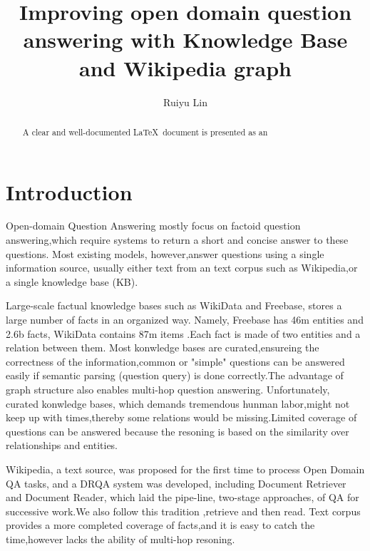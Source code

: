 \documentclass[sigconf]{acmart}
\begin{document}
	
	\title{Improving open domain question answering with Knowledge Base and Wikipedia graph}
	
	\author{Ruiyu Lin}
	
	
	\begin{abstract}
		A clear and well-documented \LaTeX\ document is presented as an
		
	\end{abstract}


	\maketitle
	
	\section{Introduction}
		Open-domain  Question Answering mostly focus on factoid question answering,which require systems to return a short and concise answer to these questions.
		Most existing models, however,answer questions using a single information
		source, usually either text from an text corpus such as Wikipedia\cite{chen2017reading},or a single knowledge base (KB).	
		
		Large-scale factual knowledge bases such as WikiData and Freebase\cite{bollacker2008freebase}, stores a large number of facts in an organized way. Namely, Freebase has 46m entities and 2.6b facts, WikiData contains 87m items .Each fact is made of two entities and a relation between them. Most konwledge bases are curated,ensureing the correctness of the information,common or "simple" questions can be answered easily if semantic parsing (question query)  is done correctly.The advantage of graph structure also enables multi-hop question answering.
		Unfortunately, curated konwledge bases, which demands tremendous hunman labor,might not keep up with times,thereby some relations would be missing.Limited coverage of questions  can be answered because the resoning is based on the similarity over relationships and entities.	
		
		Wikipedia\cite{chen2017reading}, a text source, was proposed for the first time to process Open Domain QA tasks, and a DRQA system was developed, including Document Retriever and Document Reader, which laid the pipe-line, two-stage approaches, of QA for successive work.We also follow this tradition ,retrieve and then read. 		
		Text corpus provides a more completed coverage of facts,and it is easy to catch the time,however lacks the ability of multi-hop resoning.
		
\end{document}
